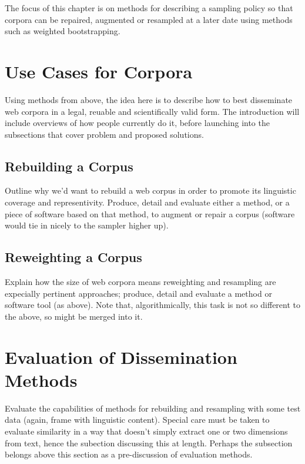 The focus of this chapter is on methods for describing a sampling policy so that corpora can be repaired, augmented or resampled at a later date using methods such as weighted bootstrapping.


\section{Use Cases for Corpora}
Using methods from above, the idea here is to describe how to best disseminate web corpora in a legal, reuable and scientifically valid form.  The introduction will include overviews of how people currently do it, before launching into the subsections that cover problem and proposed solutions.

\subsection{Rebuilding a Corpus}
Outline why we'd want to rebuild a web corpus in order to promote its linguistic coverage and representivity.  Produce, detail and evaluate either a method, or a piece of software based on that method, to augment or repair a corpus (software would tie in nicely to the sampler higher up).


\subsection{Reweighting a Corpus}
Explain how the size of web corpora means reweighting and resampling are expecially pertinent approaches; produce, detail and evaluate a method or software tool (as above).  Note that, algorithmically, this task is not so different to the above, so might be merged into it.


\section{Evaluation of Dissemination Methods}
Evaluate the capabilities of methods for rebuilding and resampling with some test data (again, frame with linguistic content).  Special care must be taken to evaluate similarity in a way that doesn't simply extract one or two dimensions from text, hence the subection discussing this at length.  Perhaps the subsection belongs above this section as a pre-discussion of evaluation methods.


